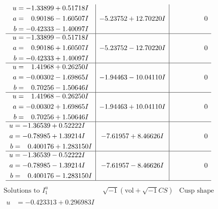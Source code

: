 \documentclass[1p]{elsarticle_modified}
\theoremstyle{definition}
\newcommand{\I}{\sqrt{-1}}
\begin{document}
$$\begin{array}{c|c|c}
\begin{aligned}
u &= -1.33899 + 0.51718 I \\
a &= \phantom{-}0.90186 - 1.60507 I \\
b &= -0.42333 - 1.40097 I\end{aligned}
 & -5.23752 + 12.70220 I & \phantom{-0.000000 } 0 \\ \hline\begin{aligned}
u &= -1.33899 - 0.51718 I \\
a &= \phantom{-}0.90186 + 1.60507 I \\
b &= -0.42333 + 1.40097 I\end{aligned}
 & -5.23752 - 12.70220 I & \phantom{-0.000000 } 0 \\ \hline\begin{aligned}
u &= \phantom{-}1.41968 + 0.26250 I \\
a &= -0.00302 - 1.69865 I \\
b &= \phantom{-}0.70256 - 1.50646 I\end{aligned}
 & -1.94463 - 10.04110 I & \phantom{-0.000000 } 0 \\ \hline\begin{aligned}
u &= \phantom{-}1.41968 - 0.26250 I \\
a &= -0.00302 + 1.69865 I \\
b &= \phantom{-}0.70256 + 1.50646 I\end{aligned}
 & -1.94463 + 10.04110 I & \phantom{-0.000000 } 0 \\ \hline\begin{aligned}
u &= -1.36539 + 0.52222 I \\
a &= -0.78985 + 1.39214 I \\
b &= \phantom{-}0.400176 + 1.283150 I\end{aligned}
 & -7.61957 + 8.46626 I & \phantom{-0.000000 } 0 \\ \hline\begin{aligned}
u &= -1.36539 - 0.52222 I \\
a &= -0.78985 - 1.39214 I \\
b &= \phantom{-}0.400176 - 1.283150 I\end{aligned}
 & -7.61957 - 8.46626 I & \phantom{-0.000000 } 0\\
 \hline 
 \end{array}$$\newpage$$\begin{array}{c|c|c}  
\text{Solutions to }I^u_{1}& \I (\text{vol} + \sqrt{-1}CS) & \text{Cusp shape}\\
 \hline 
\begin{aligned}
u &= -0.423313 + 0.296983 I \\

\end{aligned}
\end{array}$$
\end{document}
